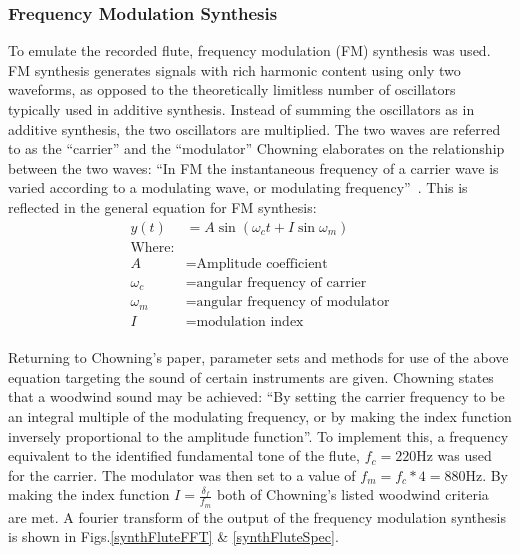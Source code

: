 \documentclass{article}
\begin{document}
        \subsubsection{Frequency Modulation Synthesis}
            To emulate the recorded flute, frequency modulation (FM) synthesis was used.
            FM synthesis generates signals with rich harmonic content using only two waveforms, as opposed to the theoretically limitless number of oscillators typically used in additive synthesis.
            Instead of summing the oscillators as in additive synthesis, the two oscillators are multiplied.
            The two waves are referred to as the ``carrier'' and the ``modulator''
            Chowning elaborates on the relationship between the two waves: ``In FM the instantaneous frequency of a carrier wave is varied according to a modulating wave, or modulating frequency''~\cite{chowning1973synthesis}.
            This is reflected in the general equation for FM synthesis:
            \begin{equation}
                \begin{split}
                    y(t) &= A\sin{(\omega_c t + I\sin{\omega_m})} \\
                    \text{Where:} \\
                    A &= \text{Amplitude coefficient} \\
                    \omega_c &= \text{angular frequency of carrier} \\
                    \omega_m &= \text{angular frequency of modulator} \\
                    I &= \text{modulation index}
                \end{split}
            \end{equation}
            \\
            Returning to Chowning's paper, parameter sets and methods for use of the above equation targeting the sound of certain instruments are given.
            Chowning states that a woodwind sound may be achieved: ``By setting the carrier frequency to be an integral multiple of the modulating frequency, or by making the index function inversely proportional to the amplitude function''.
            To implement this, a frequency equivalent to the identified fundamental tone of the flute, $f_c=220\text{Hz}$ was used for the carrier. 
            The modulator was then set to a value of $f_m = f_c * 4 = 880\text{Hz}$.
            By making the index function $I = \frac{\delta_f}{f_m}$ both of Chowning's listed woodwind criteria are met.
            A fourier transform of the output of the frequency modulation synthesis is shown in Figs.\ref{synthFluteFFT} \& \ref{synthFluteSpec}.
            
\end{document}
